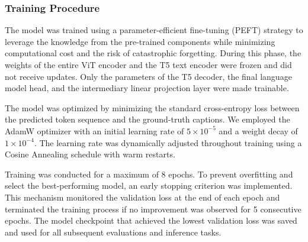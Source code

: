 \subsubsection{Training Procedure}
The model was trained using a parameter-efficient fine-tuning (PEFT) strategy to leverage the knowledge from the pre-trained components while minimizing computational cost and the risk of catastrophic forgetting. During this phase, the weights of the entire ViT encoder and the T5 text encoder were frozen and did not receive updates. Only the parameters of the T5 decoder, the final language model head, and the intermediary linear projection layer were made trainable.

The model was optimized by minimizing the standard cross-entropy loss between the predicted token sequence and the ground-truth captions. We employed the AdamW optimizer with an initial learning rate of $5 \times 10^{-5}$ and a weight decay of $1 \times 10^{-4}$. The learning rate was dynamically adjusted throughout training using a Cosine Annealing schedule with warm restarts.

Training was conducted for a maximum of 8 epochs. To prevent overfitting and select the best-performing model, an early stopping criterion was implemented. This mechanism monitored the validation loss at the end of each epoch and terminated the training process if no improvement was observed for 5 consecutive epochs. The model checkpoint that achieved the lowest validation loss was saved and used for all subsequent evaluations and inference tasks.